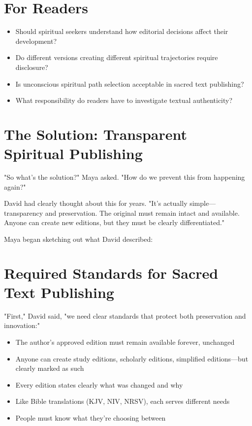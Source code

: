 \documentclass[11pt,twoside]{book}
\begin{document}
\section*{For Readers}
\label{sec:org8787c0f}
\begin{itemize}
\item Should spiritual seekers understand how editorial decisions affect their development?
\item Do different versions creating different spiritual trajectories require disclosure?
\item Is unconscious spiritual path selection acceptable in sacred text publishing?
\item What responsibility do readers have to investigate textual authenticity?
\end{itemize}
\section*{The Solution: Transparent Spiritual Publishing}
\label{sec:org9216ea2}

"So what's the solution?" Maya asked. "How do we prevent this from happening again?"

David had clearly thought about this for years. "It's actually simple—transparency and preservation. The original must remain intact and available. Anyone can create new editions, but they must be clearly differentiated."

Maya began sketching out what David described:
\section*{Required Standards for Sacred Text Publishing}
\label{sec:orga0dc330}

"First," David said, "we need clear standards that protect both preservation and innovation:"

\begin{itemize}
\item The author's approved edition must remain available forever, unchanged
\item Anyone can create study editions, scholarly editions, simplified editions—but clearly marked as such
\item Every edition states clearly what was changed and why
\item Like Bible translations (KJV, NIV, NRSV), each serves different needs
\item People must know what they're choosing between
\end{itemize}
\end{document}
